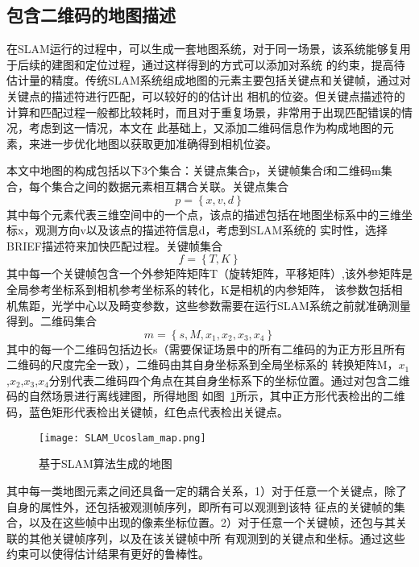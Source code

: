 \subsection{包含二维码的地图描述}
\label{sec:2.3.2}
在SLAM运行的过程中，可以生成一套地图系统，对于同一场景，该系统能够复用于后续的建图和定位过程，通过这样得到的方式可以添加对系统
的约束，提高待估计量的精度。传统SLAM系统组成地图的元素主要包括关键点和关键帧，通过对关键点的描述符进行匹配，可以较好的的估计出
相机的位姿。但关键点描述符的计算和匹配过程一般都比较耗时，而且对于重复场景，非常用于出现匹配错误的情况，考虑到这一情况，本文在
此基础上，又添加二维码信息作为构成地图的元素，来进一步优化地图以获取更加准确得到相机位姿。

本文中地图的构成包括以下3个集合：关键点集合p，关键帧集合f和二维码m集合，每个集合之间的数据元素相互耦合关联。关键点集合
\begin{equation}p = \left\{x,v,d\right\}\end{equation}
其中每个元素代表三维空间中的一个点，该点的描述包括在地图坐标系中的三维坐标x，观测方向v以及该点的描述符信息d，考虑到SLAM系统的
实时性，选择BRIEF描述符来加快匹配过程。关键帧集合
\begin{equation}f = \left\{T,K\right\}\end{equation}
其中每一个关键帧包含一个外参矩阵矩阵T（旋转矩阵，平移矩阵）,该外参矩阵是全局参考坐标系到相机参考坐标系的转化，K是相机的内参矩阵，
该参数包括相机焦距，光学中心以及畸变参数，这些参数需要在运行SLAM系统之前就准确测量得到。二维码集合
\begin{equation}m = \left\{s,M,x_1,x_2,x_3,x_4\right\}\end{equation}
其中的每一个二维码包括边长s（需要保证场景中的所有二维码的为正方形且所有二维码的尺度完全一致），二维码由其自身坐标系到全局坐标系的
转换矩阵M，$x_1$,$x_2$,$x_3$,$x_4$分别代表二维码四个角点在其自身坐标系下的坐标位置。通过对包含二维码的自然场景进行离线建图，所得地图
如图~\ref{fig:Ucoslam_map}所示，其中正方形代表检出的二维码，蓝色矩形代表检出关键帧，红色点代表检出关键点。
\begin{figure}[H] %
  \centering
  \texttt{[image: SLAM\_Ucoslam\_map.png]}
  \caption{基于SLAM算法生成的地图}
  \label{fig:Ucoslam_map}
\end{figure}

其中每一类地图元素之间还具备一定的耦合关系，1）对于任意一个关键点，除了自身的属性外，还包括被观测帧序列，即所有可以观测到该特
征点的关键帧的集合，以及在这些帧中出现的像素坐标位置。2）对于任意一个关键帧，还包与其关联的其他关键帧序列，以及在该关键帧中所
有观测到的关键点和坐标。通过这些约束可以使得估计结果有更好的鲁棒性。

